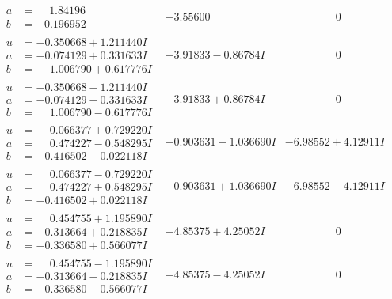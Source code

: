 \documentclass[1p]{elsarticle_modified}
\theoremstyle{definition}
\begin{document}
$$\begin{array}{c|c|c}
\begin{aligned}
a &= \phantom{-}1.84196\phantom{ +0.000000I} \\
b &= -0.196952\phantom{ +0.000000I}\end{aligned}
 & -3.55600\phantom{ +0.000000I} & \phantom{-0.000000 } 0 \\ \hline\begin{aligned}
u &= -0.350668 + 1.211440 I \\
a &= -0.074129 + 0.331633 I \\
b &= \phantom{-}1.006790 + 0.617776 I\end{aligned}
 & -3.91833 - 0.86784 I & \phantom{-0.000000 } 0 \\ \hline\begin{aligned}
u &= -0.350668 - 1.211440 I \\
a &= -0.074129 - 0.331633 I \\
b &= \phantom{-}1.006790 - 0.617776 I\end{aligned}
 & -3.91833 + 0.86784 I & \phantom{-0.000000 } 0 \\ \hline\begin{aligned}
u &= \phantom{-}0.066377 + 0.729220 I \\
a &= \phantom{-}0.474227 - 0.548295 I \\
b &= -0.416502 - 0.022118 I\end{aligned}
 & -0.903631 - 1.036690 I & -6.98552 + 4.12911 I \\ \hline\begin{aligned}
u &= \phantom{-}0.066377 - 0.729220 I \\
a &= \phantom{-}0.474227 + 0.548295 I \\
b &= -0.416502 + 0.022118 I\end{aligned}
 & -0.903631 + 1.036690 I & -6.98552 - 4.12911 I \\ \hline\begin{aligned}
u &= \phantom{-}0.454755 + 1.195890 I \\
a &= -0.313664 + 0.218835 I \\
b &= -0.336580 + 0.566077 I\end{aligned}
 & -4.85375 + 4.25052 I & \phantom{-0.000000 } 0 \\ \hline\begin{aligned}
u &= \phantom{-}0.454755 - 1.195890 I \\
a &= -0.313664 - 0.218835 I \\
b &= -0.336580 - 0.566077 I\end{aligned}
 & -4.85375 - 4.25052 I & \phantom{-0.000000 } 0 \\ \hline\begin{aligned}

\end{aligned}
\end{array}$$
\end{document}

